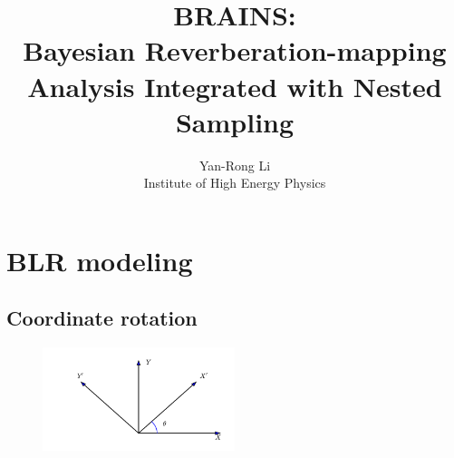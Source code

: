 \documentclass[oneside]{book}
\begin{document}
\title{\bf BRAINS:\\
Bayesian Reverberation-mapping Analysis Integrated
with Nested Sampling}
\author{Yan-Rong Li\\
Institute of High Energy Physics}

\maketitle

\chapter{BLR modeling}

\section{Coordinate rotation}
\begin{figure}[h!]
\centering
\includegraphics[width=0.5\textwidth]{coord.pdf}
\end{figure}
\end{document}
